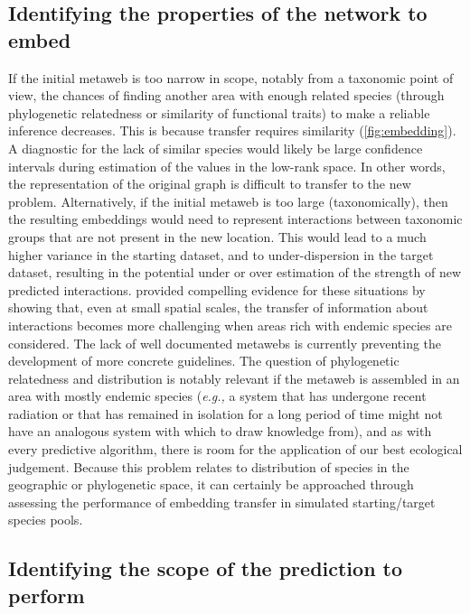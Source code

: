 \begin{refsection}
\subsection{Identifying the properties of the network to
embed}\label{identifying-the-properties-of-the-network-to-embed}

If the initial metaweb is too narrow in scope, notably from a taxonomic
point of view, the chances of finding another area with enough related
species (through phylogenetic relatedness or similarity of functional
traits) to make a reliable inference decreases. This is because transfer
requires similarity (\autoref{fig:embedding}). A diagnostic for the lack of
similar species would likely be large confidence intervals during
estimation of the values in the low-rank space. In other words, the
representation of the original graph is difficult to transfer to the new
problem. Alternatively, if the initial metaweb is too large
(taxonomically), then the resulting embeddings would need to represent
interactions between taxonomic groups that are not present in the new
location. This would lead to a much higher variance in the starting
dataset, and to under-dispersion in the target dataset, resulting in the
potential under or over estimation of the strength of new predicted
interactions. \cite{Llewelyn2022Predicting} provided compelling evidence for
these situations by showing that, even at small spatial scales, the
transfer of information about interactions becomes more challenging when
areas rich with endemic species are considered. The lack of well
documented metawebs is currently preventing the development of more
concrete guidelines. The question of phylogenetic relatedness and
distribution is notably relevant if the metaweb is assembled in an area
with mostly endemic species (\emph{e.g.,} a system that has undergone
recent radiation or that has remained in isolation for a long period of
time might not have an analogous system with which to draw knowledge
from), and as with every predictive algorithm, there is room for the
application of our best ecological judgement. Because this problem
relates to distribution of species in the geographic or phylogenetic
space, it can certainly be approached through assessing the performance
of embedding transfer in simulated starting/target species pools.

\subsection{Identifying the scope of the prediction to
perform}\label{identifying-the-scope-of-the-prediction-to-perform}


\end{refsection}
